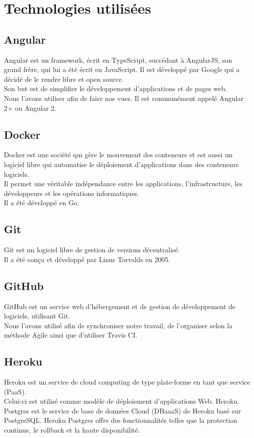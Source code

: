\section{Technologies utilisées}
	
	\subsection{Angular}
	Angular est un framework, écrit en TypeScript, succédant à AngularJS, son grand frère, qui lui a été écrit en JavaScript\cite{wikipedia-angularjs}. Il est développé par Google qui a décidé de le rendre libre et open source. \\
	Son but est de simplifier le développement d'applications et de pages web\cite{angular}. \\
	Nous l'avons utiliser afin de faire nos vues. Il est communément appelé \og{}Angular 2+\fg{} ou \og{}Angular 2\fg{}.
	
	\subsection{Docker}
	Docker est une société qui gère le mouvement des conteneurs et est aussi un logiciel libre qui automatise le déploiement d'applications dans des conteneurs logiciels. \\
	Il permet une véritable indépendance entre les applications, l'infrastructure, les développeurs et les opérations informatiques.\\ Il a été développé en Go.\cite{docker}\cite{wikipedia-docker}
	
	\subsection{Git}
	Git est un logiciel libre de gestion de versions décentralisé. \\
	Il a été conçu et développé par Linus Torvalds en 2005.\cite{wikipedia-git}
	
	\subsection{GitHub}
	GitHub est un service web d'hébergement et de gestion de développement de logiciels, utilisant Git. \\
	Nous l'avons utilisé afin de synchroniser notre travail, de l'organiser selon la méthode Agile ainsi que d'utiliser Travis CI.
	
	\subsection{Heroku}
	Heroku est un service de \og{}cloud computing\fg{} de type plate-forme en tant que service (PaaS). \\
	Celui-ci est utilisé comme modèle de déploiement d'applications Web. 
	Heroku Postgres est le service de base de données Cloud (DBaaaS) de Heroku basé sur PostgreSQL. Heroku Postgres offre des fonctionnalités telles que la protection continue, le rollback et la haute disponibilité.
	

